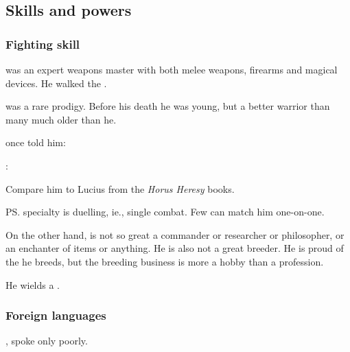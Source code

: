 \subsection{Skills and powers}





\subsubsection{Fighting skill}
\Teshrial{} was an expert weapons master with both melee weapons, firearms and magical devices. 
He walked the . 

\Teshrial was a rare prodigy.
Before his death he was young, but a better warrior than many \resphain much older than he.

 once told him: 
\begin{prose}
  \Menessiaraid:
\end{prose}

Compare him to Lucius from the \emph{Horus Heresy} books. 

\ps{\Teshrial} specialty is duelling, ie., single combat. 
Few \resphain{} can match him one-on-one. 

On the other hand, \Teshrial{} is not so great a commander or researcher or philosopher, or an enchanter of items or anything. 
He is also not a great \human{} breeder. 
He is proud of the \humans{} he breeds, but the breeding business is more a hobby than a profession. 

He wields a . 





\subsubsection{Foreign languages}
, \Teshrial spoke \Draconic only poorly. 















